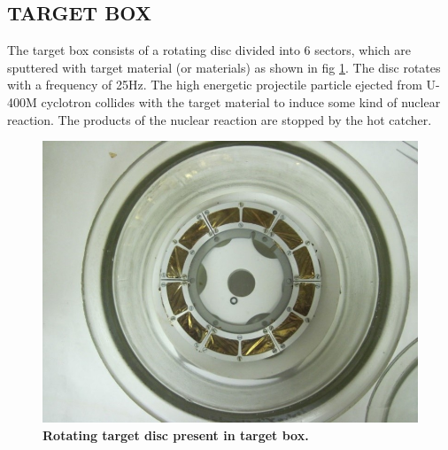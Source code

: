 \documentclass[12pt]{article}
\begin{document}
\subsection{TARGET BOX}
The target box consists of a rotating disc divided into 6 sectors, which are sputtered with target material (or materials) as shown in fig \ref{Rotating target disc present in target box.}. The disc rotates with a frequency of 25Hz\cite{georgiadis2020production}. The high energetic projectile particle ejected from U-400M cyclotron collides with the target material to induce some kind of nuclear reaction. The products of the nuclear reaction are stopped by the hot catcher.
\begin{figure}[h]
\centering
\includegraphics[scale=0.8]{Rotating Target.jpg}
\caption{\textbf{Rotating target disc present in target box.}}
\label{Rotating target disc present in target box.}
\end{figure}
\end{document}
